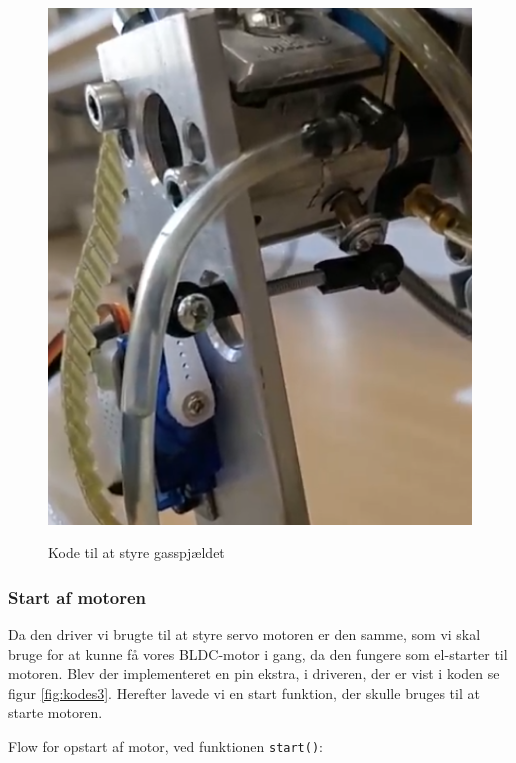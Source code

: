 \begin{figure}[!htb]
    \centering
    \begin{minipage}{.5\textwidth}
        \centering
  
  \label{fig:kodes2}
    \end{minipage}%
    \begin{minipage}{0.5\textwidth}
        \centering
        \includegraphics[width=0.8\linewidth]{mots5.png}
        \label{fig:mots5}
    \end{minipage}
    \caption{Kode til at styre gasspjældet}
  \end{figure}

\subsubsection{Start af motoren}
\label{sec:start-af-motoren}

Da den driver vi brugte til at styre servo motoren er den samme, som vi skal bruge for at kunne få vores BLDC-motor i gang, da den fungere som el-starter til motoren. Blev der implementeret en pin ekstra, i driveren, der er vist i koden se figur \ref{fig:kodes3}. Herefter lavede vi en start funktion, der skulle bruges til at starte motoren.

Flow for opstart af motor, ved funktionen \lstinline{start()}:

